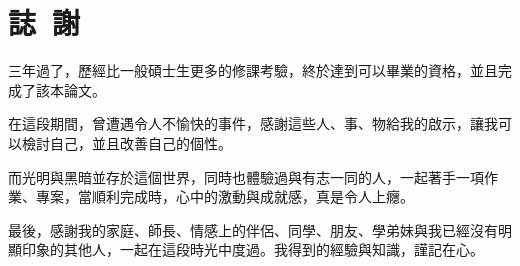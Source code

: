 \chapter*{誌~謝~}

三年過了，歷經比一般碩士生更多的修課考驗，終於達到可以畢業的資格，並且完成了該本論文。

在這段期間，曾遭遇令人不愉快的事件，感謝這些人、事、物給我的啟示，讓我可以檢討自己，並且改善自己的個性。

而光明與黑暗並存於這個世界，同時也體驗過與有志一同的人，一起著手一項作業、專案，當順利完成時，心中的激動與成就感，真是令人上癮。

最後，感謝我的家庭、師長、情感上的伴侶、同學、朋友、學弟妹與我已經沒有明顯印象的其他人，一起在這段時光中度過。我得到的經驗與知識，謹記在心。